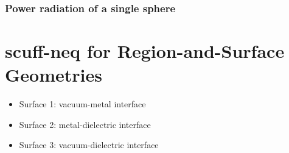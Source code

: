 \documentclass[letterpaper]{article}
\begin{document}
\subsubsection{Power radiation of a single sphere}



\newpage
\section{{\sc scuff-neq} for Region-and-Surface Geometries}

\begin{itemize}
 \item Surface 1: vacuum-metal interface
 \item Surface 2: metal-dielectric interface
 \item Surface 3: vacuum-dielectric interface
\end{itemize}
\end{document}
